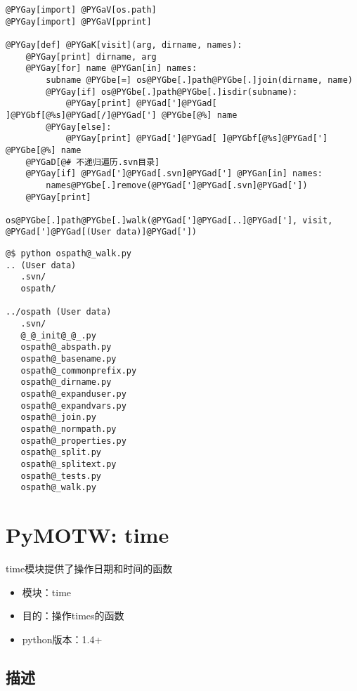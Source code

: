\documentclass[a4paper,10pt,english]{manual}
\begin{document}
\begin{Verbatim}[commandchars=@\[\]]
@PYGay[import] @PYGaV[os.path]
@PYGay[import] @PYGaV[pprint]

@PYGay[def] @PYGaK[visit](arg, dirname, names):
    @PYGay[print] dirname, arg
    @PYGay[for] name @PYGan[in] names:
        subname @PYGbe[=] os@PYGbe[.]path@PYGbe[.]join(dirname, name)
        @PYGay[if] os@PYGbe[.]path@PYGbe[.]isdir(subname):
            @PYGay[print] @PYGad[']@PYGad[ ]@PYGbf[@%s]@PYGad[/]@PYGad['] @PYGbe[@%] name
        @PYGay[else]:
            @PYGay[print] @PYGad[']@PYGad[ ]@PYGbf[@%s]@PYGad['] @PYGbe[@%] name
    @PYGaD[@# 不递归遍历.svn目录]
    @PYGay[if] @PYGad[']@PYGad[.svn]@PYGad['] @PYGan[in] names:
        names@PYGbe[.]remove(@PYGad[']@PYGad[.svn]@PYGad['])
    @PYGay[print]

os@PYGbe[.]path@PYGbe[.]walk(@PYGad[']@PYGad[..]@PYGad['], visit, @PYGad[']@PYGad[(User data)]@PYGad['])
\end{Verbatim}

\begin{Verbatim}[commandchars=@\[\]]
@$ python ospath@_walk.py
.. (User data)
   .svn/
   ospath/

../ospath (User data)
   .svn/
   @_@_init@_@_.py
   ospath@_abspath.py
   ospath@_basename.py
   ospath@_commonprefix.py
   ospath@_dirname.py
   ospath@_expanduser.py
   ospath@_expandvars.py
   ospath@_join.py
   ospath@_normpath.py
   ospath@_properties.py
   ospath@_split.py
   ospath@_splitext.py
   ospath@_tests.py
   ospath@_walk.py
\end{Verbatim}

\resetcurrentobjects


\section{PyMOTW: time}

time模块提供了操作日期和时间的函数
\begin{itemize}
\item {} 
模块：time

\item {} 
目的：操作times的函数

\item {} 
python版本：1.4+

\end{itemize}


\subsection{描述}
\end{document}
